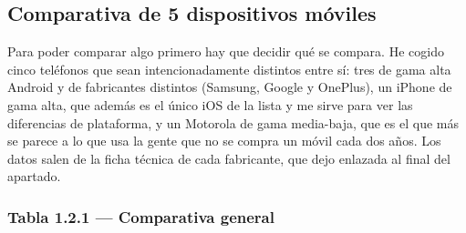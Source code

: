 \subsection{Comparativa de 5 dispositivos móviles}

Para poder comparar algo primero hay que decidir qué se compara. He cogido cinco teléfonos que sean intencionadamente distintos entre sí: tres de gama alta Android y de fabricantes distintos (Samsung, Google y OnePlus), un iPhone de gama alta, que además es el único iOS de la lista y me sirve para ver las diferencias de plataforma, y un Motorola de gama media-baja, que es el que más se parece a lo que usa la gente que no se compra un móvil cada dos años. Los datos salen de la ficha técnica de cada fabricante, que dejo enlazada al final del apartado.

\subsubsection*{Tabla 1.2.1 --- Comparativa general}

